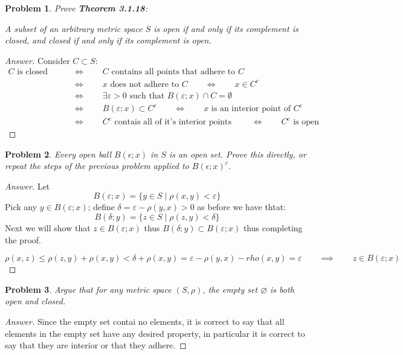 \documentclass{article}
\newtheorem{problem}{Problem}[section]
\newcommand{\qiq}{\qquad \implies \qquad}
\newcommand{\qiffq}{\qquad \iff \qquad}
\begin{document}
\begin{problem}
    Prove \textbf{Theorem 3.1.18}:

    A subset of an arbitrary metric space $S$ is open if and only if its complement is closed, and closed if and only if its complement is open.
\end{problem}

\begin{proof}[Answer]
    Consider $C\subset S$:
    \begin{align*}
        C\text{ is closed } &\qiffq C \text{ contains all points that adhere to } C \\
        &\qiffq x \text{ does not adhere to } C\qiffq x \in C^c \\
        &\qiffq \exists \varepsilon>0 \text{ such that } B(\varepsilon; x) \cap C = \emptyset\\
        &\qiffq B(\varepsilon; x) \subset C^c \qiffq x \text{ is an interior point of } C^c\\
        &\qiffq C^c \text{ contais all of it's interior points } \qiffq C^c \text{ is open}
    \end{align*}
\end{proof}

\begin{problem}
    Every open ball $B(\epsilon ; x)$ in $S$ is an open set. Prove this directly, or repeat the steps of the previous problem applied to $B(\epsilon ; x)^{c}$.
\end{problem}

\begin{proof}[Answer]
    Let $$B(\varepsilon ; x) = \{y\in S\mid \rho(x,y)<\varepsilon\}$$
    Pick any $y\in B(\varepsilon ; x)$; define $\delta=\varepsilon - \rho(y,x)>0$ as before we have thtat:
    $$B(\delta ; y) = \{z\in S\mid \rho(z,y)<\delta\}$$
    Next we will show that $z\in B(\varepsilon ; x)$ thus $B(\delta ; y)\subset B(\varepsilon ; x)$ thus completing the proof.

    $$\rho(x,z) \leq \rho(z,y) + \rho(x,y) < \delta + \rho(x,y) = \varepsilon - \rho(y,x) - rho(x,y)=\varepsilon \qiq z\in B(\varepsilon; x)$$
\end{proof}

\begin{problem}
Argue that for any metric space $(S, \rho)$, the empty set $\varnothing$ is both open and closed.
\end{problem}

\begin{proof}[Answer]
    Since the empty set contai no elements, it is correct to say that all elements in the empty set have any desired property, in particular it is correct to say that they are interior or that they adhere.
\end{proof}
\end{document}
